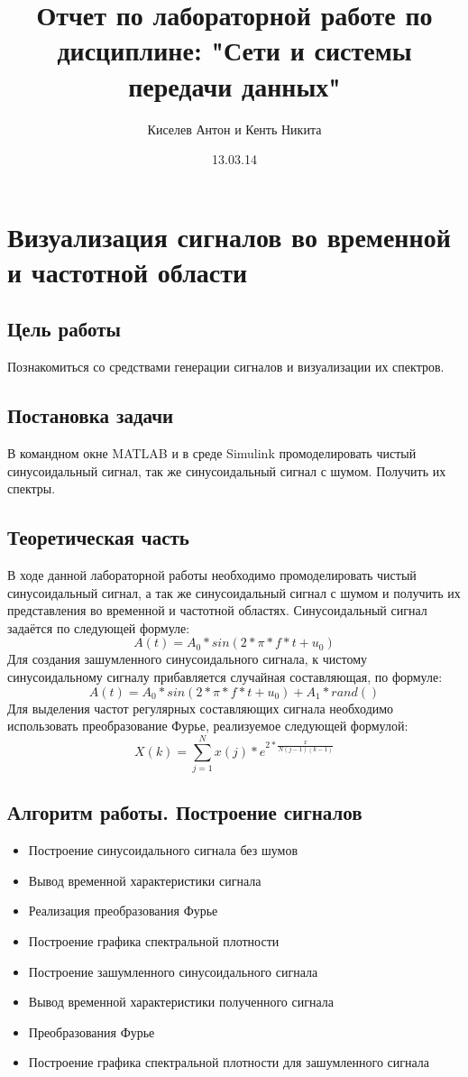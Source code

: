 \documentclass[10pt,a4paper]{report}
\author{Киселев Антон и Кенть Никита}
\title{Отчет по лабораторной работе по дисциплине: "Сети и системы передачи данных"\newline
}
\date{13.03.14}
\begin{document}
\maketitle
\pagebreak
\chapter {Визуализация сигналов во временной и частотной области}
\section{Цель работы}
Познакомиться со средствами генерации сигналов и визуализации их спектров.
\section{Постановка задачи}
В командном окне MATLAB и в среде Simulink промоделировать чистый синусоидальный сигнал, 
так же синусоидальный сигнал с шумом. Получить их спектры.

\section{Теоретическая часть}
В ходе данной лабораторной работы необходимо промоделировать чистый синусоидальный сигнал, а так же синусоидальный сигнал с шумом и получить их представления во временной и частотной областях. Синусоидальный сигнал задаётся по следующей формуле: 
\begin{displaymath}
A(t) = A_0 * sin(2*\pi *f*t + u_0)
\end{displaymath}
Для создания зашумленного синусоидального сигнала, к чистому синусоидальному сигналу прибавляется случайная составляющая, по формуле:
\begin{displaymath}
A(t) = A_0 * sin(2*\pi *f*t + u_0) + A_1*rand()
\end{displaymath}
Для выделения частот регулярных составляющих сигнала необходимо использовать преобразование Фурье, реализуемое следующей формулой:
\begin{displaymath}
X(k) = \sum_{j=1}^N x(j)*e^{2*\frac{x}{N(j-1)(k-1)}}
\end{displaymath}
\section{Алгоритм работы. Построение сигналов}
\begin{itemize}
\item Построение синусоидального сигнала без шумов
\item Вывод временной характеристики сигнала
\item Реализация  преобразования Фурье 
\item Построение графика спектральной плотности 
\item Построение зашумленного синусоидального сигнала  
\item Вывод временной характеристики полученного сигнала
\item Преобразования Фурье 
\item Построение графика спектральной плотности для зашумленного сигнала
\end{itemize}
\end{document}
